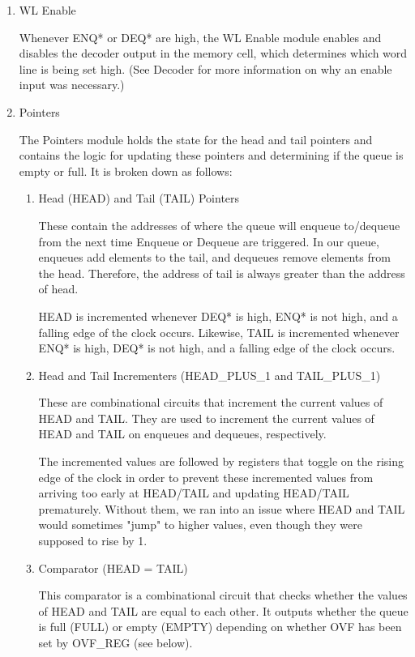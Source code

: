 \documentclass[12pt]{report}
\begin{document}
\begin{enumerate}
  \item WL Enable

  Whenever ENQ* or DEQ* are high, the WL Enable module enables and disables the decoder output in the memory cell, which determines which word line is being set high. (See Decoder for more information on why an enable input was necessary.)

  \item Pointers

  The Pointers module holds the state for the head and tail pointers and contains the logic for updating these pointers and determining if the queue is empty or full. It is broken down as follows:
  \begin{enumerate}
    \item Head (HEAD) and Tail (TAIL) Pointers

    These contain the addresses of where the queue will enqueue to/dequeue from the next time Enqueue or Dequeue are triggered. In our queue, enqueues add elements to the tail, and dequeues remove elements from the head. Therefore, the address of tail is always greater than the address of head.

    HEAD is incremented whenever DEQ* is high, ENQ* is not high, and a falling edge of the clock occurs. Likewise, TAIL is incremented whenever ENQ* is high, DEQ* is not high, and a falling edge of the clock occurs.

    \item Head and Tail Incrementers (HEAD_PLUS_1 and TAIL_PLUS_1)

    These are combinational circuits that increment the current values of HEAD and TAIL. They are used to increment the current values of HEAD and TAIL on enqueues and dequeues, respectively.

    The incremented values are followed by registers that toggle on the rising edge of the clock in order to prevent these incremented values from arriving too early at HEAD/TAIL and updating HEAD/TAIL prematurely. Without them, we ran into an issue where HEAD and TAIL would sometimes "jump" to higher values, even though they were supposed to rise by 1.

    \item Comparator (HEAD = TAIL)

    This comparator is a combinational circuit that checks whether the values of HEAD and TAIL are equal to each other. It outputs whether the queue is full (FULL) or empty (EMPTY) depending on whether OVF has been set by OVF_REG (see below).


\end{enumerate}
\end{enumerate}
\end{document}

